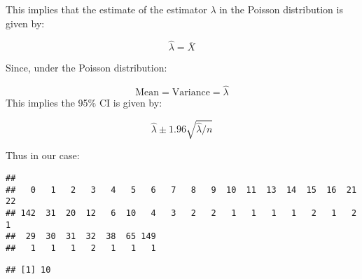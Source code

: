 \documentclass[]{article}
\newenvironment{Shaded}{\begin{snugshade}}{\end{snugshade}}
\newcommand{\KeywordTok}[1]{\textcolor[rgb]{0.13,0.29,0.53}{\textbf{#1}}}
\newcommand{\FloatTok}[1]{\textcolor[rgb]{0.00,0.00,0.81}{#1}}
\newcommand{\StringTok}[1]{\textcolor[rgb]{0.31,0.60,0.02}{#1}}
\newcommand{\CommentTok}[1]{\textcolor[rgb]{0.56,0.35,0.01}{\textit{#1}}}
\newcommand{\OperatorTok}[1]{\textcolor[rgb]{0.81,0.36,0.00}{\textbf{#1}}}
\newcommand{\NormalTok}[1]{#1}
\begin{document}
This implies that the estimate of the estimator \(\lambda\) in the
Poisson distribution is given by:

\[ \hat{\lambda} = \overline{X}\]

Since, under the Poisson distribution:

\[\text{Mean} = \text{Variance} = \hat{\lambda} \] This implies the 95\%
CI is given by:

\[\hat{\lambda} \pm  1.96\sqrt{\hat{\lambda}/n}\]

Thus in our case:

\begin{Shaded}
\end{Shaded}

\begin{verbatim}
## 
##   0   1   2   3   4   5   6   7   8   9  10  11  13  14  15  16  21  22 
## 142  31  20  12   6  10   4   3   2   2   1   1   1   1   2   1   2   1 
##  29  30  31  32  38  65 149 
##   1   1   1   2   1   1   1
\end{verbatim}

\begin{Shaded}
\end{Shaded}

\begin{verbatim}
## [1] 10
\end{verbatim}

\begin{Shaded}
\end{Shaded}
\end{document}
